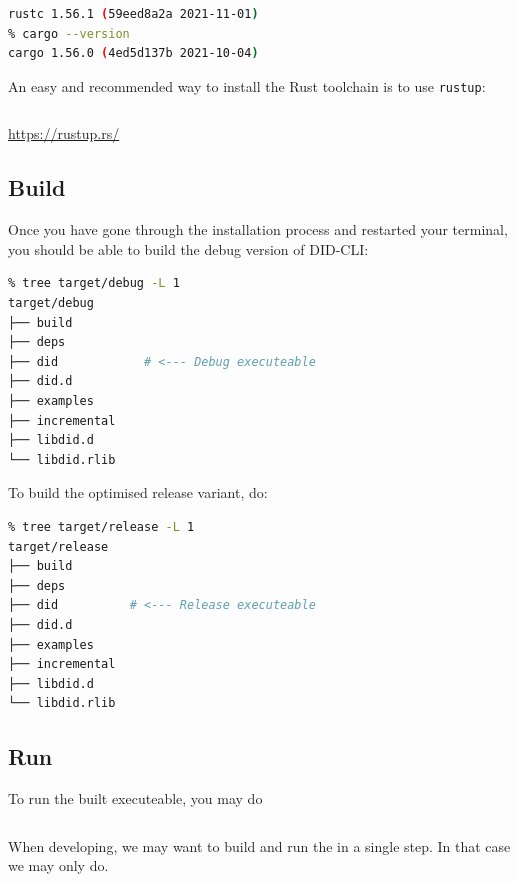 \begin{lstlisting}[language=bash]
% rustc --version
rustc 1.56.1 (59eed8a2a 2021-11-01)
% cargo --version
cargo 1.56.0 (4ed5d137b 2021-10-04)
\end{lstlisting}

An easy and recommended way to install the Rust toolchain is to use
\lstinline!rustup!:

\begin{lstlisting}[language=bash]
% curl --proto '=https' --tlsv1.2 -sSf https://sh.rustup.rs | sh
\end{lstlisting}

\url{https://rustup.rs/}

\hypertarget{build}{%
\subsection{Build}\label{build}}

Once you have gone through the installation process and restarted your
terminal, you should be able to build the debug version of DID-CLI:

\begin{lstlisting}[language=bash]
% cargo build
% tree target/debug -L 1  
target/debug
├── build
├── deps
├── did            # <--- Debug executeable
├── did.d
├── examples
├── incremental
├── libdid.d
└── libdid.rlib
\end{lstlisting}

To build the optimised release variant, do:

\begin{lstlisting}[language=bash]
% cargo build --release
% tree target/release -L 1
target/release
├── build
├── deps
├── did          # <--- Release executeable
├── did.d
├── examples
├── incremental
├── libdid.d
└── libdid.rlib
\end{lstlisting}

\hypertarget{run-1}{%
\subsection{Run}\label{run-1}}

To run the built executeable, you may do

\begin{lstlisting}[language=bash]
% ./target/debug/did
\end{lstlisting}

When developing, we may want to build and run the in a single step. In
that case we may only do.

